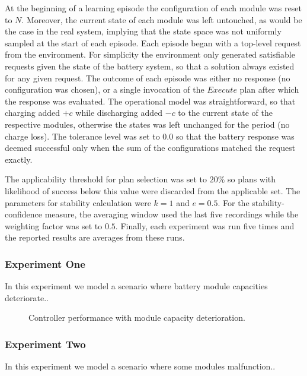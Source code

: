 At the beginning of a learning episode the configuration of each module was reset to $N$. Moreover, the current state of each module was left untouched, as would be the case in the real system, implying that the state space was not uniformly sampled at the start of each episode. Each episode began with a top-level request from the environment. For simplicity the environment only generated satisfiable requests given the state of the battery system, so that a solution always existed for any given request. The outcome of each episode was either no response (no configuration was chosen), or a single invocation of the $Execute$ plan after which the response was evaluated. The operational model was straightforward, so that charging added $+c$ while discharging added $-c$ to the current state of the respective modules, otherwise the states was left unchanged for the period (no charge loss). The tolerance level was set to $0.0$ so that the battery response was deemed successful only when the sum of the configurations matched the request exactly.

The applicability threshold for plan selection was set to $20\%$ so plans with likelihood of success below this value were discarded from the applicable set. The parameters for stability calculation were $k=1$ and $e=0.5$. For the stability-confidence measure, the averaging window used the last five recordings while the weighting factor was set to $0.5$. Finally, each experiment was run five times and the reported results are averages from these runs.

\subsubsection{Experiment One}

In this experiment we model a scenario where battery module capacities deteriorate..

\begin{figure}[ht]
\begin{center}

\end{center}
\caption{Controller performance with module capacity deterioration.}
\label{fig:experiment1}
\end{figure}

\subsubsection{Experiment Two}

In this experiment we model a scenario where some modules malfunction..

